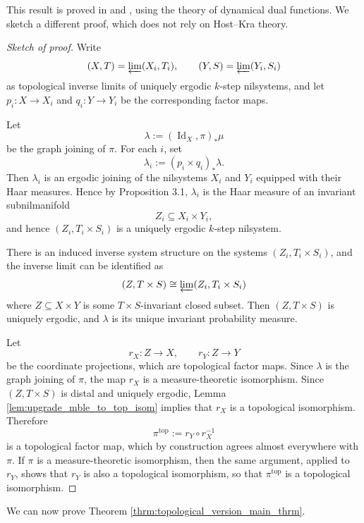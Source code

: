 \documentclass[12pt]{amsart}
\theoremstyle{plain}
\theoremstyle{definition}
\DeclareMathOperator{\Id}{Id}
\begin{document}
This result is proved in \cite[Theorem A.1]{host2010nilsequences} and \cite[Chapter 13, Proposition 15]{hk-book}, using the theory of dynamical dual functions.
We sketch a different proof, which does not rely on Host--Kra theory. 

\begin{proof}[Sketch of proof]
    Write 
    \[
    (X, T) = \varprojlim (X_i, T_i), \qquad (Y, S) = \varprojlim (Y_i, S_i)
    \]
    as topological inverse limits of uniquely ergodic $k$-step nilsystems, and let $p_i \colon X \to X_i$ and $q_i \colon Y \to Y_i$ be the corresponding factor maps. 

    Let 
    \[
    \lambda := (\Id_X, \pi)_* \mu
    \]
    be the graph joining of $\pi$.
    For each $i$, set 
    \[
    \lambda_i := (p_i \times q_i)_* \lambda.
    \]
    Then $\lambda_i$ is an ergodic joining of the nilsystems $X_i$ and $Y_i$ equipped with their Haar measures. 
    Hence by Proposition 3.1, $\lambda_i$ is the Haar measure of an invariant subnilmanifold 
    \[
    Z_i \subseteq X_i \times Y_i, 
    \]
    and hence $(Z_i, T_i \times S_i)$ is a uniquely ergodic $k$-step nilsystem. 

    There is an induced inverse system structure on the systems $(Z_i, T_i \times S_i)$, and the inverse limit can be identified as 
    \[
    (Z, T \times S) \cong \varprojlim (Z_i, T_i \times S_i)
    \]
    where $Z \subseteq X \times Y$ is some $T \times S$-invariant closed subset.
    Then $(Z, T \times S)$ is uniquely ergodic, and $\lambda$ is its unique invariant probability measure.

    Let 
    \[
    r_X \colon Z \to X, \qquad r_Y \colon Z \to Y
    \]
    be the coordinate projections, which are topological factor maps. 
    Since $\lambda$ is the graph joining of $\pi$, the map $r_X$ is a measure-theoretic isomorphism. 
    Since $(Z, T \times S)$ is distal and uniquely ergodic, Lemma \ref{lem:upgrade_mble_to_top_isom} implies that $r_X$ is a topological isomorphism. 
    Therefore 
    \[
    \pi^{\mathrm{top}} := r_Y \circ r_X^{-1}
    \]
    is a topological factor map, which by construction agrees almost everywhere with $\pi$.
    If $\pi$ is a measure-theoretic isomorphism, then the same argument, applied to $r_Y$, shows that $r_Y$ is also a topological isomorphism, so that $\pi^{\mathrm{top}}$ is a topological isomorphism. 
\end{proof}

We can now prove Theorem \ref{thrm:topological_version_main_thrm}. 
\end{document}
